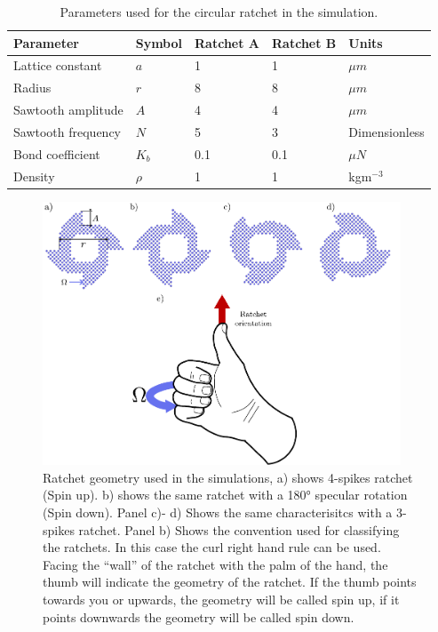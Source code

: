 \begin{table}[H]
\centering
\caption[Ratchet physical parameters.]{Parameters used for the circular ratchet in the simulation.}
\begin{tabular}{l l l l l}
\hline
Parameter & Symbol & Ratchet A & Ratchet B & Units \\
\hline
Lattice constant & \(a\) & 1 & 1 & \(\mu m\) \\
Radius & \( r\) & 8 & 8 & \( \mu m\) \\
Sawtooth amplitude & \( A\) & 4 & 4 & \( \mu m\) \\
Sawtooth frequency & \( N\) & 5 & 3 & Dimensionless\\
Bond coefficient & \( K_b\) & 0.1 & 0.1 & \( \mu N\) \\ 
Density & \(\rho\) & 1 & 1 & kgm\(^{-3}\) \\
\hline
\end{tabular}
\end{table}

\begin{figure}
  \begin{center}
    \includegraphics[width=0.95\textwidth]{figures/ratchet.pdf}
  \end{center}
  \caption[Ratchet geomety.]{Ratchet geometry used in the simulations, a) shows 4-spikes ratchet (Spin up). b) shows the same ratchet with a 180° specular rotation (Spin down). Panel c)- d) Shows the same characterisitcs with a 3-spikes ratchet.  Panel b) Shows the convention used for classifying the ratchets. In this case the curl right hand rule can be used. Facing the ``wall'' of the ratchet with the palm of the hand, the thumb will indicate the geometry of the ratchet. If the thumb points towards you or upwards, the geometry will be called spin up, if it points downwards the geometry will be called spin down.}\label{fig:ratchetgeometry}
\end{figure}



